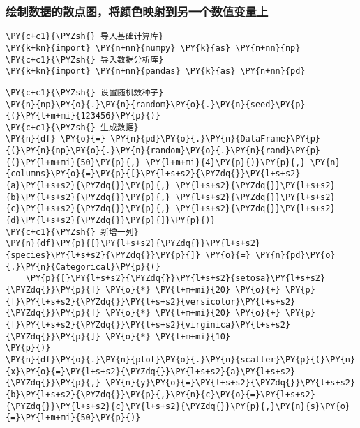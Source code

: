     \hypertarget{ux7ed8ux5236ux6570ux636eux7684ux6563ux70b9ux56feux5c06ux989cux8272ux6620ux5c04ux5230ux53e6ux4e00ux4e2aux6570ux503cux53d8ux91cfux4e0a}{%
\subsubsection{绘制数据的散点图，将颜色映射到另一个数值变量上}\label{ux7ed8ux5236ux6570ux636eux7684ux6563ux70b9ux56feux5c06ux989cux8272ux6620ux5c04ux5230ux53e6ux4e00ux4e2aux6570ux503cux53d8ux91cfux4e0a}}

    \begin{tcolorbox}[breakable, size=fbox, boxrule=1pt, pad at break*=1mm,colback=cellbackground, colframe=cellborder]
\begin{Verbatim}[commandchars=\\\{\}]
\PY{c+c1}{\PYZsh{} 导入基础计算库}
\PY{k+kn}{import} \PY{n+nn}{numpy} \PY{k}{as} \PY{n+nn}{np}
\PY{c+c1}{\PYZsh{} 导入数据分析库}
\PY{k+kn}{import} \PY{n+nn}{pandas} \PY{k}{as} \PY{n+nn}{pd}
\end{Verbatim}
\end{tcolorbox}

    \begin{tcolorbox}[breakable, size=fbox, boxrule=1pt, pad at break*=1mm,colback=cellbackground, colframe=cellborder]
\begin{Verbatim}[commandchars=\\\{\}]
\PY{c+c1}{\PYZsh{} 设置随机数种子}
\PY{n}{np}\PY{o}{.}\PY{n}{random}\PY{o}{.}\PY{n}{seed}\PY{p}{(}\PY{l+m+mi}{123456}\PY{p}{)}
\PY{c+c1}{\PYZsh{} 生成数据}
\PY{n}{df} \PY{o}{=} \PY{n}{pd}\PY{o}{.}\PY{n}{DataFrame}\PY{p}{(}\PY{n}{np}\PY{o}{.}\PY{n}{random}\PY{o}{.}\PY{n}{rand}\PY{p}{(}\PY{l+m+mi}{50}\PY{p}{,} \PY{l+m+mi}{4}\PY{p}{)}\PY{p}{,} \PY{n}{columns}\PY{o}{=}\PY{p}{[}\PY{l+s+s2}{\PYZdq{}}\PY{l+s+s2}{a}\PY{l+s+s2}{\PYZdq{}}\PY{p}{,} \PY{l+s+s2}{\PYZdq{}}\PY{l+s+s2}{b}\PY{l+s+s2}{\PYZdq{}}\PY{p}{,} \PY{l+s+s2}{\PYZdq{}}\PY{l+s+s2}{c}\PY{l+s+s2}{\PYZdq{}}\PY{p}{,} \PY{l+s+s2}{\PYZdq{}}\PY{l+s+s2}{d}\PY{l+s+s2}{\PYZdq{}}\PY{p}{]}\PY{p}{)}
\PY{c+c1}{\PYZsh{} 新增一列}
\PY{n}{df}\PY{p}{[}\PY{l+s+s2}{\PYZdq{}}\PY{l+s+s2}{species}\PY{l+s+s2}{\PYZdq{}}\PY{p}{]} \PY{o}{=} \PY{n}{pd}\PY{o}{.}\PY{n}{Categorical}\PY{p}{(}
    \PY{p}{[}\PY{l+s+s2}{\PYZdq{}}\PY{l+s+s2}{setosa}\PY{l+s+s2}{\PYZdq{}}\PY{p}{]} \PY{o}{*} \PY{l+m+mi}{20} \PY{o}{+} \PY{p}{[}\PY{l+s+s2}{\PYZdq{}}\PY{l+s+s2}{versicolor}\PY{l+s+s2}{\PYZdq{}}\PY{p}{]} \PY{o}{*} \PY{l+m+mi}{20} \PY{o}{+} \PY{p}{[}\PY{l+s+s2}{\PYZdq{}}\PY{l+s+s2}{virginica}\PY{l+s+s2}{\PYZdq{}}\PY{p}{]} \PY{o}{*} \PY{l+m+mi}{10}
\PY{p}{)}
\PY{n}{df}\PY{o}{.}\PY{n}{plot}\PY{o}{.}\PY{n}{scatter}\PY{p}{(}\PY{n}{x}\PY{o}{=}\PY{l+s+s2}{\PYZdq{}}\PY{l+s+s2}{a}\PY{l+s+s2}{\PYZdq{}}\PY{p}{,} \PY{n}{y}\PY{o}{=}\PY{l+s+s2}{\PYZdq{}}\PY{l+s+s2}{b}\PY{l+s+s2}{\PYZdq{}}\PY{p}{,}\PY{n}{c}\PY{o}{=}\PY{l+s+s2}{\PYZdq{}}\PY{l+s+s2}{c}\PY{l+s+s2}{\PYZdq{}}\PY{p}{,}\PY{n}{s}\PY{o}{=}\PY{l+m+mi}{50}\PY{p}{)}
\end{Verbatim}
\end{tcolorbox}

